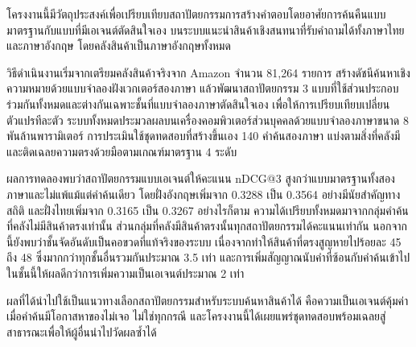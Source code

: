 
โครงงานนี้มีวัตถุประสงค์เพื่อเปรียบเทียบสถาปัตยกรรมการสร้างคำตอบโดยอาศัยการค้นคืนแบบมาตรฐานกับแบบที่มีเอเจนต์ตัดสินใจเอง บนระบบแนะนำสินค้าเชิงสนทนาที่รับคำถามได้ทั้งภาษาไทยและภาษาอังกฤษ โดยคลังสินค้าเป็นภาษาอังกฤษทั้งหมด

วิธีดำเนินงานเริ่มจากเตรียมคลังสินค้าจริงจาก Amazon จำนวน 81{,}264 รายการ สร้างดัชนีค้นหาเชิงความหมายด้วยแบบจำลองฝังเวกเตอร์สองภาษา แล้วพัฒนาสถาปัตยกรรม 3 แบบที่ใช้ส่วนประกอบร่วมกันทั้งหมดและต่างกันเฉพาะชั้นที่แบบจำลองภาษาตัดสินใจเอง เพื่อให้การเปรียบเทียบเปลี่ยนตัวแปรทีละตัว ระบบทั้งหมดประมวลผลบนเครื่องคอมพิวเตอร์ส่วนบุคคลด้วยแบบจำลองภาษาขนาด 8 พันล้านพารามิเตอร์ การประเมินใช้ชุดทดสอบที่สร้างขึ้นเอง 140 คำค้นสองภาษา แบ่งตามสิ่งที่คลังมี และติดเฉลยความตรงด้วยมือตามเกณฑ์มาตรฐาน 4 ระดับ

ผลการทดลองพบว่าสถาปัตยกรรมแบบเอเจนต์ให้คะแนน nDCG@3 สูงกว่าแบบมาตรฐานทั้งสองภาษาและไม่แพ้แม้แต่คำค้นเดียว โดยฝั่งอังกฤษเพิ่มจาก 0.3288 เป็น 0.3564 อย่างมีนัยสำคัญทางสถิติ และฝั่งไทยเพิ่มจาก 0.3165 เป็น 0.3267 อย่างไรก็ตาม ความได้เปรียบทั้งหมดมาจากกลุ่มคำค้นที่คลังไม่มีสินค้าตรงเท่านั้น ส่วนกลุ่มที่คลังมีสินค้าตรงนั้นทุกสถาปัตยกรรมได้คะแนนเท่ากัน นอกจากนี้ยังพบว่าชั้นจัดอันดับเป็นคอขวดที่แท้จริงของระบบ เนื่องจากทำให้สินค้าที่ตรงสูญหายไปร้อยละ 45 ถึง 48 ซึ่งมากกว่าทุกชั้นอื่นรวมกันประมาณ 3.5 เท่า และการเพิ่มสัญญาณนับคำที่ซ้อนกับคำค้นเข้าไปในชั้นนี้ให้ผลดีกว่าการเพิ่มความเป็นเอเจนต์ประมาณ 2 เท่า

ผลที่ได้นำไปใช้เป็นแนวทางเลือกสถาปัตยกรรมสำหรับระบบค้นหาสินค้าได้ คือความเป็นเอเจนต์คุ้มค่าเมื่อคำค้นมีโอกาสหาของไม่เจอ ไม่ใช่ทุกกรณี และโครงงานนี้ได้เผยแพร่ชุดทดสอบพร้อมเฉลยสู่สาธารณะเพื่อให้ผู้อื่นนำไปวัดผลซ้ำได้
